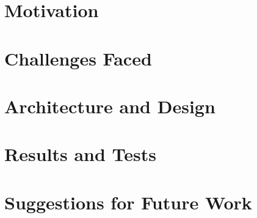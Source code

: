\section{Motivation}

\section{Challenges Faced}

\section{Architecture and Design}

\section{Results and Tests}

\section{Suggestions for Future Work}


